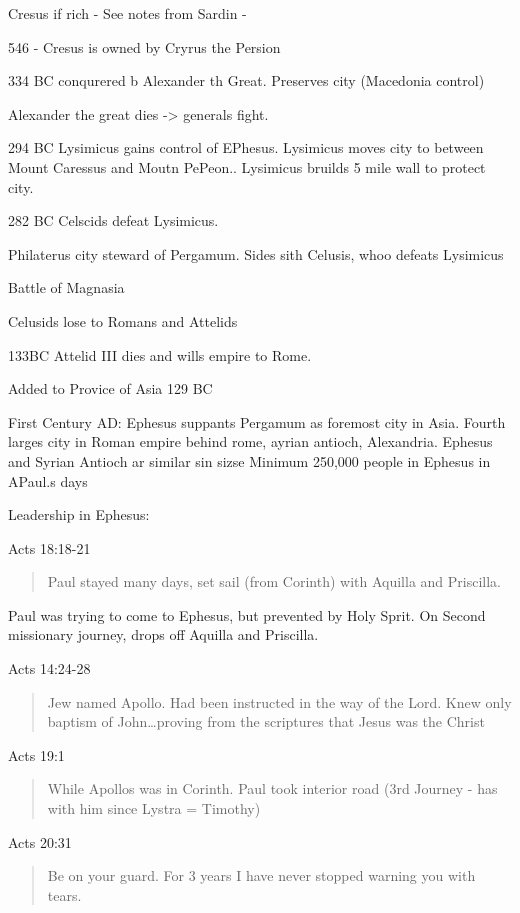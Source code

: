 \documentclass[
]{book}
\begin{document}
Cresus if rich - See notes from Sardin -

546 - Cresus is owned by Cryrus the Persion

334 BC conqurered b Alexander th Great. Preserves city (Macedonia control)

Alexander the great dies -\textgreater{} generals fight.

294 BC Lysimicus gains control of EPhesus. Lysimicus moves city to between Mount Caressus and Moutn PePeon.. Lysimicus bruilds 5 mile wall to protect city.

282 BC Celscids defeat Lysimicus.

Philaterus city steward of Pergamum. Sides sith Celusis, whoo defeats Lysimicus

Battle of Magnasia

Celusids lose to Romans and Attelids

133BC Attelid III dies and wills empire to Rome.

Added to Provice of Asia 129 BC

First Century AD: Ephesus suppants Pergamum as foremost city in Asia. Fourth larges city in Roman empire behind rome, ayrian antioch, Alexandria. Ephesus and Syrian Antioch ar similar sin sizse Minimum 250,000 people in Ephesus in APaul.s days

Leadership in Ephesus:

Acts 18:18-21

\begin{quote}
Paul stayed many days, set sail (from Corinth) with Aquilla and Priscilla.
\end{quote}

Paul was trying to come to Ephesus, but prevented by Holy Sprit. On Second missionary journey, drops off Aquilla and Priscilla.

Acts 14:24-28

\begin{quote}
Jew named Apollo. Had been instructed in the way of the Lord. Knew only baptism of John\ldots proving from the scriptures that Jesus was the Christ
\end{quote}

Acts 19:1

\begin{quote}
While Apollos was in Corinth. Paul took interior road (3rd Journey - has with him since Lystra = Timothy)
\end{quote}

Acts 20:31

\begin{quote}
Be on your guard. For 3 years I have never stopped warning you with tears.
\end{quote}
\end{document}
